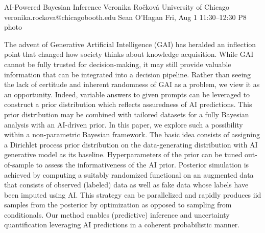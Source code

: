\clearpage
\begin{talk}
  {AI-Powered Bayesian Inference}%
  {Veronika Ro\v{c}kov\'a}%
  {University of Chicago}%
  {veronika.rockova@chicagobooth.edu}%
  {Sean O'Hagan}%
  {}%
  {Fri, Aug 1 11:30--12:30}%
  {P8}%
  {photo}%
  
    
   
The advent of Generative Artificial Intelligence (GAI) has heralded an inflection point that changed how society thinks about knowledge acquisition. While GAI cannot be fully trusted for decision-making, it may still provide valuable information that can be integrated into a decision pipeline. Rather than seeing the lack of certitude and inherent randomness of GAI as a problem, we view it as an opportunity. Indeed, variable answers to given prompts can be leveraged to construct a prior distribution which reflects assuredness of AI predictions. This prior distribution may be combined with tailored datasets for a fully Bayesian analysis with an AI-driven prior. In this paper, we explore such a possibility within a non-parametric Bayesian framework. The basic idea consists of assigning a Dirichlet process prior distribution on the data-generating distribution with AI generative model as its baseline. Hyperparameters of the prior can be tuned out-of-sample to assess the informativeness of the AI prior. Posterior simulation is achieved by computing a suitably randomized functional on an augmented data that consists of observed (labeled) data as well as fake data whose labels have been imputed using AI. This strategy can be parallelized and rapidly produces iid samples from the posterior by optimization as opposed to sampling from conditionals. Our method enables (predictive) inference and uncertainty quantification leveraging AI predictions in a coherent probabilistic manner.

\medskip

\end{talk}

